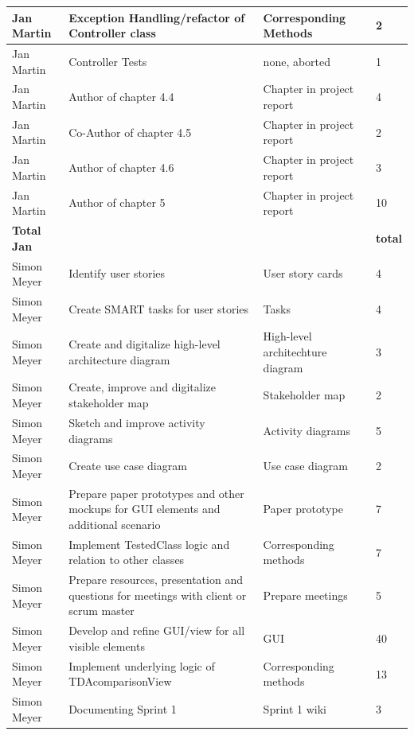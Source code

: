 \begin{longtable}{|p{}||p{}|p{}|p{}|}
    \hline    
    Jan Martin & Exception Handling/refactor of Controller class & Corresponding Methods & 2 \\ 
    \hline  
    Jan Martin & Controller Tests & none, aborted & 1 \\ 
    \hline  
    Jan Martin & Author of chapter 4.4 & Chapter in project report & 4 \\ 
    \hline
    Jan Martin & Co-Author of chapter 4.5 & Chapter in project report & 2 \\
    \hline 
    Jan Martin & Author of chapter 4.6 & Chapter in project report & 3 \\ 
    \hline
    Jan Martin & Author of chapter 5 & Chapter in project report & 10 \\ 
    \hline
    \hline 
    \textbf{Total \newline Jan} & & & \textbf{total}   \\
    \hline
    \hline
    Simon Meyer & Identify user stories & User story cards & 4 \\
    \hline
    Simon Meyer & Create SMART tasks for user stories & Tasks & 4 \\
    \hline
    Simon Meyer & Create and digitalize high-level architecture diagram & High-level architechture diagram & 3 \\ 
    \hline
    Simon Meyer & Create, improve and digitalize stakeholder map & Stakeholder map & 2 \\ 
    \hline
    Simon Meyer & Sketch and improve activity diagrams & Activity diagrams & 5 \\ 
    \hline
    Simon Meyer & Create use case diagram & Use case diagram & 2 \\ 
    \hline
    Simon Meyer & Prepare paper prototypes and other mockups for GUI elements and additional scenario & Paper prototype & 7 \\
    \hline
    Simon Meyer & Implement TestedClass logic and relation to other classes & Corresponding methods & 7 \\ 
    \hline
    Simon Meyer & Prepare resources, presentation and questions for meetings with client or scrum master & Prepare meetings & 5 \\ 
    \hline
    Simon Meyer & Develop and refine GUI/view for all visible elements & GUI & 40 \\ 
    \hline
    Simon Meyer & Implement underlying logic of TDAcomparisonView & Corresponding methods & 13 \\ 
    \hline
    Simon Meyer & Documenting Sprint 1 & Sprint 1 wiki & 3 \\ 

\end{longtable}
